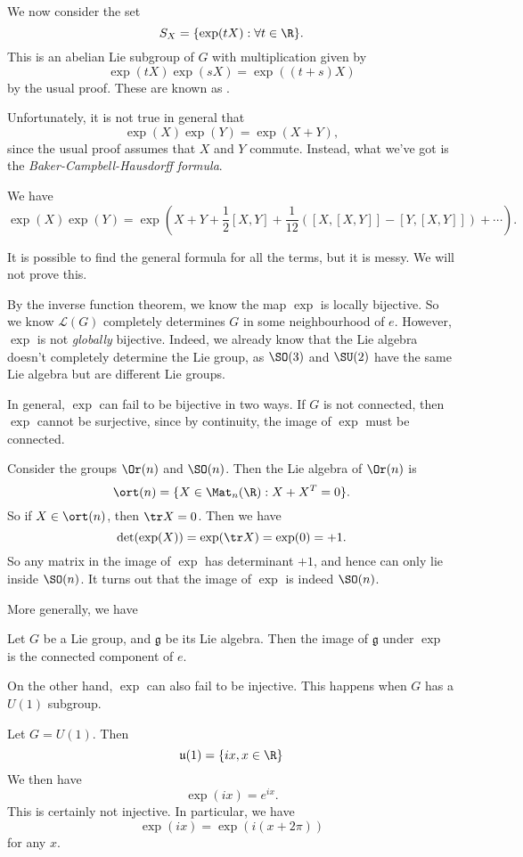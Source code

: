 \documentclass[a4paper]{article}
\begin{document}
We now consider the set
\[
  S_{X} = \{\exp(tX): \forall t \in \R\}.
\]
This is an abelian Lie subgroup of $G$ with multiplication given by
\[
  \exp(tX) \exp(sX) = \exp((t + s)X)
\]
by the usual proof. These are known as .

Unfortunately, it is not true in general that
\[
  \exp(X) \exp(Y) = \exp(X + Y),
\]
since the usual proof assumes that $X$ and $Y$ commute. Instead, what we've got is the \emph{Baker-Campbell-Hausdorff formula}.
\begin{thm}
  We have
  \[
    \exp(X) \exp(Y) = \exp\left(X + Y + \frac{1}{2}[X, Y] + \frac{1}{12}([X, [X, Y]] - [Y, [X, Y]]) + \cdots\right).
  \]
\end{thm}
It is possible to find the general formula for all the terms, but it is messy. We will not prove this.

By the inverse function theorem, we know the map $\exp$ is locally bijective. So we know $\mathcal{L}(G)$ completely determines $G$ in some neighbourhood of $e$. However, $\exp$ is not \emph{globally} bijective. Indeed, we already know that the Lie algebra doesn't completely determine the Lie group, as $\SO(3)$ and $\SU(2)$ have the same Lie algebra but are different Lie groups.

In general, $\exp$ can fail to be bijective in two ways. If $G$ is not connected, then $\exp$ cannot be surjective, since by continuity, the image of $\exp$ must be connected.

\begin{eg}
  Consider the groups $\Or(n)$ and $\SO(n)$. Then the Lie algebra of $\Or(n)$ is
  \[
    \ort(n) = \{X \in \Mat_n(\R): X + X^T = 0\}.
  \]
  So if $X \in \ort(n)$, then $\tr X = 0$. Then we have
  \[
    \det (\exp(X)) = \exp(\tr X) = \exp(0) = +1.
  \]
  So any matrix in the image of $\exp$ has determinant $+1$, and hence can only lie inside $\SO(n)$. It turns out that the image of $\exp$ is indeed $\SO(n)$.
\end{eg}

More generally, we have
\begin{prop}
  Let $G$ be a Lie group, and $\mathfrak{g}$ be its Lie algebra. Then the image of $\mathfrak{g}$ under $\exp$ is the connected component of $e$.
\end{prop}

On the other hand, $\exp$ can also fail to be injective. This happens when $G$ has a $U(1)$ subgroup.
\begin{eg}
  Let $G = U(1)$. Then
  \[
    \mathfrak{u}(1) = \{ix, x \in \R\}
  \]
  We then have
  \[
    \exp(ix) = e^{ix}.
  \]
  This is certainly not injective. In particular, we have
  \[
    \exp(ix) = \exp(i(x + 2\pi))
  \]
  for any $x$.
\end{eg}
\end{document}
